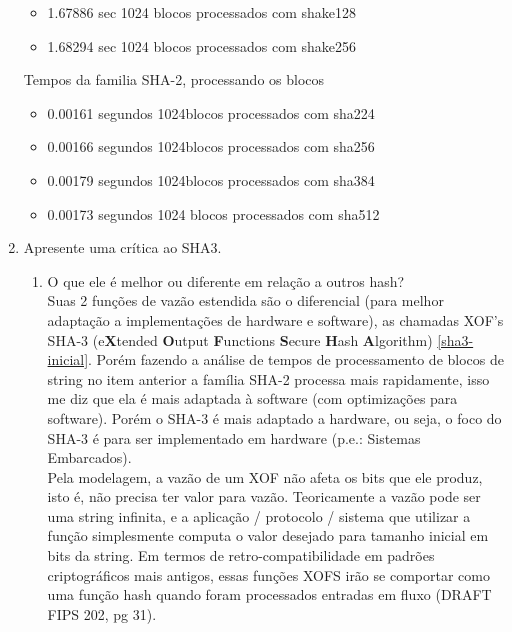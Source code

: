 \documentclass[12pt, a4paper]{article}
\begin{document}
\begin{enumerate}
\begin{itemize}
    \item
    1.67886 sec
    1024 blocos processados com shake128

    \item
    1.68294 sec
    1024 blocos processados com shake256\\
  \end{itemize}

    Tempos da familia SHA-2, processando os blocos\\

  \begin{itemize}
    \item
    0.00161 segundos
    1024blocos processados com sha224

    \item
    0.00166 segundos
    1024blocos processados com sha256

    \item
    0.00179 segundos
    1024blocos processados com sha384

    \item
    0.00173 segundos
    1024 blocos processados com sha512
  \end{itemize}

\item Apresente uma crítica ao SHA3.\\

  \begin{enumerate}
    \item O que ele é melhor ou diferente em relação a outros hash?\\

    Suas 2 funções de vazão estendida são o diferencial (para melhor adaptação a
    implementações de hardware e software), as chamadas XOF's SHA-3
    (e\textbf{X}tended \textbf{O}utput \textbf{F}unctions \textbf{S}ecure
    \textbf{H}ash \textbf{A}lgorithm) \ref{sha3-inicial}. Porém fazendo a
    análise de tempos de processamento de blocos de string no item anterior a
    família SHA-2 processa mais rapidamente, isso me diz que ela é mais adaptada
    à software (com optimizações para software). Porém o SHA-3 é mais adaptado a
    hardware, ou seja, o foco do SHA-3 é para ser implementado em hardware
    (p.e.: Sistemas Embarcados).\\

    Pela modelagem, a vazão de um XOF não afeta os bits que ele produz, isto é,
    não precisa ter valor para vazão. Teoricamente a vazão pode ser uma string
    infinita, e a aplicação / protocolo / sistema que utilizar a função
    simplesmente computa o valor desejado para tamanho inicial em bits da
    string. Em termos de retro-compatibilidade em padrões criptográficos mais
    antigos, essas funções XOFS irão se comportar como uma função hash quando
    foram processados entradas em fluxo (DRAFT FIPS 202, pg 31).


\end{enumerate}
\end{enumerate}
\end{document}
